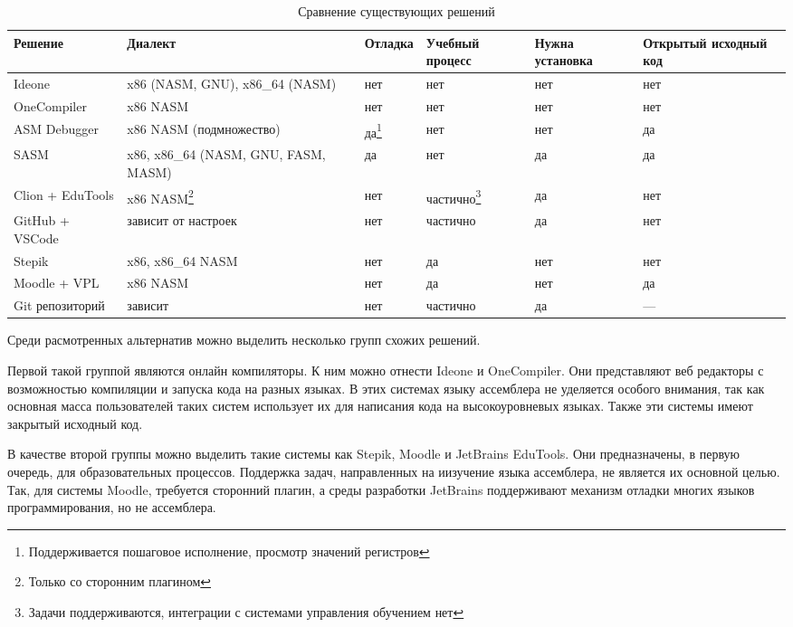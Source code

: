 \documentclass[a4paper,article,14pt]{extarticle}
\begin{document}
\begin{center}
\small
    \begin{longtable}{|p{3.5cm}|p{2cm}|p{2cm}|p{2cm}|p{2cm}|p{2cm}|}
    \caption{Сравнение существующих решений}\label{table:alternatives} \\
    \hline
    \textbf{Решение} & \textbf{Диалект} & \textbf{Отладка} & \textbf{Учебный процесс} & \textbf{Нужна установка} & \textbf{Открытый исходный код} \\
    \hline
    Ideone & x86 (NASM, GNU), x86\_64 (NASM) & нет & нет & нет & нет \\ \hline
    OneCompiler & x86 NASM & нет & нет & нет & нет \\ \hline
    ASM Debugger & x86 NASM (подмножество) & да\footnote{Поддерживается пошаговое исполнение, просмотр значений регистров} & нет & нет & да \\ \hline
    SASM & x86, x86\_64 (NASM, GNU, FASM, MASM) & да & нет & да & да \\ \hline
    Clion + EduTools & x86 NASM\footnote{Только со сторонним плагином} & нет & частично\footnote{Задачи поддерживаются, интеграции с системами управления обучением нет} & да & нет \\ \hline
    GitHub + VSCode & зависит от настроек & нет & частично & да & нет \\ \hline
    Stepik & x86, x86\_64 NASM & нет & да & нет & нет \\ \hline
    Moodle + VPL & x86 NASM & нет & да & нет & да \\ \hline
    Git репозиторий & зависит & нет & частично & да & --- \\ \hline
    \end{longtable}
\normalsize
\end{center}

Среди расмотренных альтернатив можно выделить несколько групп схожих решений.

Первой такой группой являются онлайн компиляторы. К ним можно отнести Ideone и OneCompiler. Они представляют веб редакторы с возможностью компиляции и запуска кода на разных языках. В этих системах языку ассемблера не уделяется особого внимания, так как основная масса пользователей таких систем использует их для написания кода на высокоуровневых языках. Также эти системы имеют закрытый исходный код.

В качестве второй группы можно выделить такие системы как Stepik, Moodle и JetBrains EduTools. Они предназначены, в первую очередь, для образовательных процессов. Поддержка задач, направленных на иизучение языка ассемблера, не является их основной целью. Так, для системы Moodle, требуется сторонний плагин, а среды разработки JetBrains поддерживают механизм отладки многих языков программирования, но не ассемблера.
\end{document}

